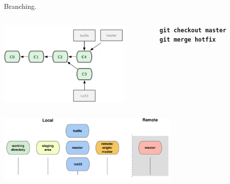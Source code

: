 \documentclass{beamer}
\begin{document}
\begin{frame}{Branching.}
  \begin{columns}
    \begin{column}{0.6\linewidth}
      \begin{center}
        \includegraphics[width=6.5cm]{UniBo.IDSEPC.A2022.LavoroCondiviso/18333fig0314c-tn}
      \end{center}
    \end{column}
    \begin{column}{0.45\linewidth}
      \begin{center}
        \texttt{\textbf{git checkout master}}\\
        \texttt{\textbf{git merge hotfix}}\\
      \end{center}
    \end{column}
  \end{columns}
  \begin{center}
    \includegraphics[width=9cm]{UniBo.IDSEPC.A2022.LavoroCondiviso/git-branch2}
  \end{center}
\end{frame}
\end{document}
